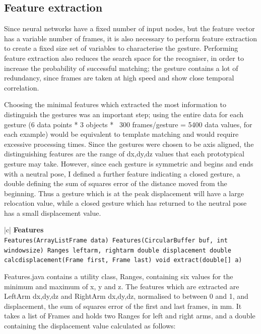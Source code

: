 \documentclass[12pt,a4,notitlepage]{report}
\renewcommand{\_}{\texttt{\symbol{95}}}
\newcommand{\<}{\texttt{\symbol{60}}}
\renewcommand{\>}{\texttt{\symbol{62}}}
\newcommand{\class}[1]{\textbf{#1}}
\newcommand{\variable}[1]{\texttt{#1}}
\begin{document}
{\subsection{Feature extraction}

Since neural networks have a fixed number of input nodes, but the feature vector has a variable number of frames, it is also necessary to perform feature extraction to create a fixed size set of variables to characterise the gesture. Performing feature extraction also reduces the search space for the recogniser, in order to increase the probability of successful matching; the gesture contains a lot of redundancy, since frames are taken at high speed and show close temporal correlation.

Choosing the minimal features which extracted the most information to distinguish the gestures was an important step; using the entire data for each gesture (6 data points * 3 objects * ~300 frames/gesture = 5400 data values, for each example) would be equivalent to template matching and would require excessive processing times. Since the gestures were chosen to be axis aligned, the distinguishing features are the range of dx,dy,dz values that each prototypical gesture may take. However, since each gesture is symmetric and begins and ends with a neutral pose, I defined a further feature indicating a closed gesture, a double defining the sum of squares error of the distance moved from the beginning. Thus a gesture which is at the peak displacement will have a large relocation value, while a closed gesture which has returned to the neutral pose has a small displacement value.

\begin{tabular}{|c|} \hline 
\class{Features} \\ \hline
{}
{\variable{Features(ArrayList\<Frame\> data) \newline
Features(CircularBuffer buf, int windowsize) \newline
Ranges leftarm, rightarm \newline
double displacement \newline
double calc\_displacement(Frame first, Frame last) \newline
void extract(double[] a)
} } \\ \hline
\end{tabular}

Features.java contains a utility class, Ranges, containing six values for the minimum and maximum of x, y and z. The features which are extracted are LeftArm {dx,dy,dz} and RightArm {dx,dy,dz}, normalised to between 0 and 1, and displacement, the sum of squares error of the first and last frames, in mm. It takes a list of Frames and holds two Ranges for left and right arms, and a double containing the displacement value calculated as follows:

}
\end{document}
